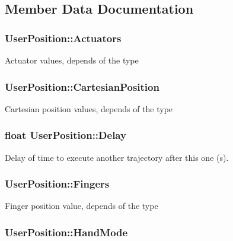 \subsection{Member Data Documentation}
\hypertarget{struct_user_position_ab0c5b71622c1e0d3033572578e947cf3}{
\subsubsection[{Actuators}]{ User\-Position\-::\-Actuators}}\label{struct_user_position_ab0c5b71622c1e0d3033572578e947cf3}
Actuator values, depends of the type \hypertarget{struct_user_position_ab363c40971853637f728978e604c438f}{
\subsubsection[{Cartesian\-Position}]{ User\-Position\-::\-Cartesian\-Position}}\label{struct_user_position_ab363c40971853637f728978e604c438f}
Cartesian position values, depends of the type \hypertarget{struct_user_position_aa18896c1238a50c8ad81c66dfd76ac5e}{
\subsubsection[{Delay}]{\setlength{\rightskip}{0pt plus 5cm}float User\-Position\-::\-Delay}}\label{struct_user_position_aa18896c1238a50c8ad81c66dfd76ac5e}
Delay of time to execute another trajectory after this one (s). \hypertarget{struct_user_position_a727907bb6a98b0f3d10aaa8011b67927}{
\subsubsection[{Fingers}]{ User\-Position\-::\-Fingers}}\label{struct_user_position_a727907bb6a98b0f3d10aaa8011b67927}
Finger position value, depends of the type \hypertarget{struct_user_position_a83779902810d0e5e16d533e0f964c0df}{
\subsubsection[{Hand\-Mode}]{ User\-Position\-::\-Hand\-Mode}}\label{struct_user_position_a83779902810d0e5e16d533e0f964c0df}

